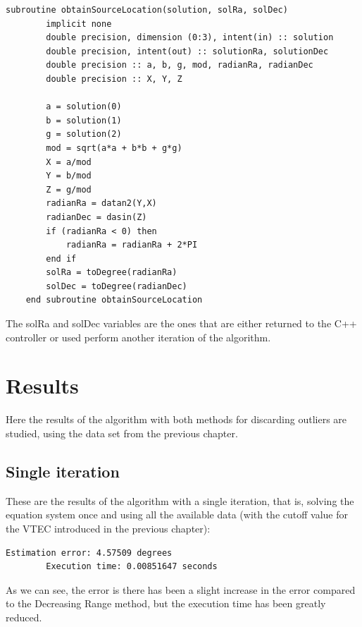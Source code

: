 \begin{minipage}{\linewidth}
	\label{lst:obtainSource}
	\begin{lstlisting}[style=myFortranStyle, caption=Function obtainSourceLocation]
	subroutine obtainSourceLocation(solution, solRa, solDec)
		implicit none
		double precision, dimension (0:3), intent(in) :: solution
		double precision, intent(out) :: solutionRa, solutionDec
		double precision :: a, b, g, mod, radianRa, radianDec
		double precision :: X, Y, Z
		
		a = solution(0)
		b = solution(1)
		g = solution(2)
		mod = sqrt(a*a + b*b + g*g)
		X = a/mod
		Y = b/mod
		Z = g/mod
		radianRa = datan2(Y,X)
		radianDec = dasin(Z)
		if (radianRa < 0) then
			radianRa = radianRa + 2*PI
		end if
		solRa = toDegree(radianRa)
		solDec = toDegree(radianDec)
	end subroutine obtainSourceLocation\end{lstlisting}
\end{minipage}

The solRa and solDec variables are the ones that are either returned to the C++ controller or used perform another iteration of the algorithm.

\section{Results}

Here the results of the algorithm with both methods for discarding outliers are studied, using the data set from the previous chapter.

\subsection{Single iteration}

These are the results of the algorithm with a single iteration, that is, solving the equation system once and using all the available data (with the cutoff value for the VTEC introduced in the previous chapter):

\begin{minipage}{\linewidth}
	\begin{lstlisting}[style=myFortranStyle, caption=One iteration of the Least Squares method]
		Estimation error: 4.57509 degrees
		Execution time: 0.00851647 seconds\end{lstlisting}
\end{minipage}

As we can see, the error is there has been a slight increase in the error compared to the Decreasing Range method, but the execution time has been greatly reduced.

